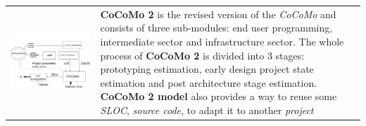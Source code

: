 \documentclass{article}
\begin{document}
\begin{tabular}{C{5.5cm}  L{10cm}}
        \includegraphics[scale=0.22]{cattura8.png} &  \newline 
        \textbf{CoCoMo 2} is the revised version of the \emph{CoCoMo} and consists of three sub-modules: end user programming, intermediate sector and infrastructure sector. The whole process of \textbf{CoCoMo 2} is divided into 3 stages: prototyping estimation, early design project state estimation and  post architecture stage estimation. 
\textbf{CoCoMo 2 model} also provides a way to reuse some \emph{SLOC}, \emph{source code}, to adapt it to another \emph{project}   \\
\end{tabular}\\\\

\clearpage
\end{document}
